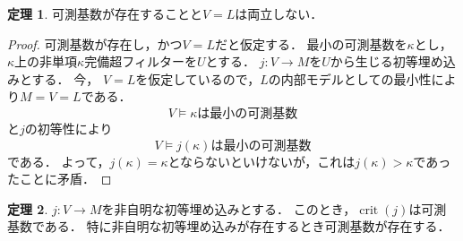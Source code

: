 \documentclass[uplatex]{jsarticle}
\newcommand{\crit}{\operatorname{crit}}
\theoremstyle{definition}
\newtheorem{thm}{定理}[section]
\begin{document}
	\begin{thm}
		可測基数が存在することと$V = L$は両立しない．
	\end{thm}
	\begin{proof}
		可測基数が存在し，かつ$V = L$だと仮定する．
		最小の可測基数を$\kappa$とし，$\kappa$上の非単項$\kappa$完備超フィルターを$U$とする．
		$j \colon V \to M$を$U$から生じる初等埋め込みとする．
		今， $V = L$を仮定しているので，$L$の内部モデルとしての最小性により$M = V = L$である．
		\[V \models \text{$\kappa$は最小の可測基数}\]
		と$j$の初等性により
		\[V \models \text{$j(\kappa)$は最小の可測基数}\]
		である．
		よって，$j(\kappa) = \kappa$とならないといけないが，これは$j(\kappa) > \kappa$であったことに矛盾．
	\end{proof}
	
	\begin{thm}
		$j \colon V \to M$を非自明な初等埋め込みとする．
		このとき，$\crit(j)$は可測基数である．
		特に非自明な初等埋め込みが存在するとき可測基数が存在する．
	\end{thm}
\end{document}
